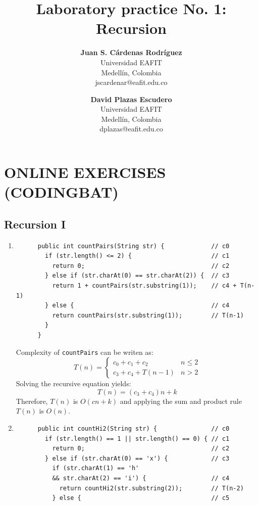 \documentclass[a4paper,12pt]{article}
\title{\color{Eblue}\textbf{Laboratory practice No. 1: Recursion}}
\author{
  \textbf{Juan S. Cárdenas Rodríguez}\\
  Universidad EAFIT\\
  Medellín, Colombia\\
  jscardenar@eafit.edu.co
\and
  \textbf{David Plazas Escudero}\\
  Universidad EAFIT\\
  Medellín, Colombia\\
  dplazas@eafit.edu.co
}
\begin{document}
  \maketitle
  \thispagestyle{fancy}

  \section{ONLINE EXERCISES (CODINGBAT)}
  \subsection{Recursion I}
    \begin{enumerate}
      \item \begin{Verbatim}
      public int countPairs(String str) {             // c0
        if (str.length() <= 2) {                      // c1
          return 0;                                   // c2
        } else if (str.charAt(0) == str.charAt(2)) {  // c3
          return 1 + countPairs(str.substring(1));    // c4 + T(n-1)
        } else {                                      // c4
          return countPairs(str.substring(1));        // T(n-1)
        }
      }
      \end{Verbatim}
      Complexity of \texttt{countPairs} can be writen as:
      \begin{equation*}
        T\left( n \right)=\left\{\begin{array}{cc} c_{0}+c_{1}+c_{2} & n\leq 2 \\ c_{3}+c_{4}+T\left( n-1 \right) & n>2\end{array}\right.
      \end{equation*}
      Solving the recursive equation yields:
      \begin{equation*}
        T\left( n \right)=(c_3+c_4)n+k
      \end{equation*}
      Therefore, $T(n)$ is $O(cn+k)$ and applying the sum and product rule $T(n)$ is $O(n)$.
      \item \begin{Verbatim}
      public int countHi2(String str) {               // c0
        if (str.length() == 1 || str.length() == 0) { // c1
          return 0;                                   // c2
        } else if (str.charAt(0) == 'x') {            // c3
          if (str.charAt(1) == 'h'
          && str.charAt(2) == 'i') {                  // c4
            return countHi2(str.substring(2));        // T(n-2)
          } else {                                    // c5

\end{Verbatim}
\end{enumerate}
\end{document}
